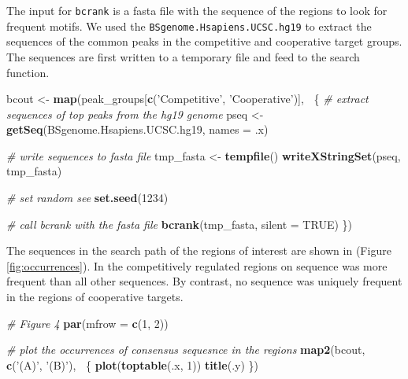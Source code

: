 \documentclass[9pt,a4paper,]{extarticle}
\newenvironment{Shaded}{\begin{snugshade}}{\end{snugshade}}
\newcommand{\CommentTok}[1]{\textcolor[rgb]{0.56,0.35,0.01}{\textit{#1}}}
\newcommand{\DataTypeTok}[1]{\textcolor[rgb]{0.13,0.29,0.53}{#1}}
\newcommand{\DecValTok}[1]{\textcolor[rgb]{0.00,0.00,0.81}{#1}}
\newcommand{\KeywordTok}[1]{\textcolor[rgb]{0.13,0.29,0.53}{\textbf{#1}}}
\newcommand{\NormalTok}[1]{#1}
\newcommand{\OperatorTok}[1]{\textcolor[rgb]{0.81,0.36,0.00}{\textbf{#1}}}
\newcommand{\OtherTok}[1]{\textcolor[rgb]{0.56,0.35,0.01}{#1}}
\newcommand{\StringTok}[1]{\textcolor[rgb]{0.31,0.60,0.02}{#1}}
\begin{document}
The input for \texttt{bcrank} is a fasta file with the sequence of the regions to look for frequent motifs. We used the \texttt{BSgenome.Hsapiens.UCSC.hg19} to extract the sequences of the common peaks in the competitive and cooperative target groups. The sequences are first written to a temporary file and feed to the search function.

\begin{Shaded}
\begin{Highlighting}[]
\NormalTok{bcout <-}\StringTok{ }\KeywordTok{map}\NormalTok{(peak_groups[}\KeywordTok{c}\NormalTok{(}\StringTok{'Competitive'}\NormalTok{, }\StringTok{'Cooperative'}\NormalTok{)], }\OperatorTok{~}\NormalTok{\{}
    \CommentTok{# extract sequences of top peaks from the hg19 genome}
\NormalTok{    pseq <-}\StringTok{ }\KeywordTok{getSeq}\NormalTok{(BSgenome.Hsapiens.UCSC.hg19, }\DataTypeTok{names =}\NormalTok{ .x)}
                 
    \CommentTok{# write sequences to fasta file}
\NormalTok{    tmp_fasta <-}\StringTok{ }\KeywordTok{tempfile}\NormalTok{()}
    \KeywordTok{writeXStringSet}\NormalTok{(pseq, tmp_fasta)}
                 
    \CommentTok{# set random see}
    \KeywordTok{set.seed}\NormalTok{(}\DecValTok{1234}\NormalTok{)}
                  
    \CommentTok{# call bcrank with the fasta file}
    \KeywordTok{bcrank}\NormalTok{(tmp_fasta, }\DataTypeTok{silent =} \OtherTok{TRUE}\NormalTok{)}
\NormalTok{\})}
\end{Highlighting}
\end{Shaded}

The sequences in the search path of the regions of interest are shown in (Figure \ref{fig:occurrences}). In the competitively regulated regions on sequence was more frequent than all other sequences. By contrast, no sequence was uniquely frequent in the regions of cooperative targets.

\begin{Shaded}
\begin{Highlighting}[]
\CommentTok{# Figure 4}
\KeywordTok{par}\NormalTok{(}\DataTypeTok{mfrow =} \KeywordTok{c}\NormalTok{(}\DecValTok{1}\NormalTok{, }\DecValTok{2}\NormalTok{))}

\CommentTok{# plot the occurrences of consensus sequesnce in the regions}
\KeywordTok{map2}\NormalTok{(bcout, }\KeywordTok{c}\NormalTok{(}\StringTok{'(A)'}\NormalTok{, }\StringTok{'(B)'}\NormalTok{), }\OperatorTok{~}\NormalTok{\{}
    \KeywordTok{plot}\NormalTok{(}\KeywordTok{toptable}\NormalTok{(.x, }\DecValTok{1}\NormalTok{))}
    \KeywordTok{title}\NormalTok{(.y)}
\NormalTok{\})}
\end{Highlighting}
\end{Shaded}
\end{document}
